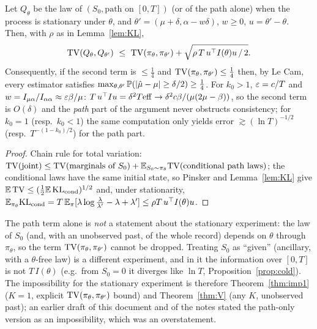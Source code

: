 \begin{theorem}[two-point bound for the stationary experiment, $K=1$]\label{thm:B}\Pt{}
Let $Q_\theta$ be the law of $(S_0,\text{path on }[0,T])$ (or of the path alone) when the process is stationary under $\theta$, and $\theta'=(\mu+\delta,\alpha-w\delta)$, $w\ge0$, $u=\theta'-\theta$. Then, with $\rho$ as in Lemma~\ref{lem:KL},
\[
\TV(Q_\theta,Q_{\theta'})\ \le\ \TV(\pi_\theta,\pi_{\theta'})+\sqrt{\rho\,T\,u\T I(\theta)u\,/\,2}.
\]
Consequently, if the second term is $\le\frac14$ and $\TV(\pi_\theta,\pi_{\theta'})\le\frac14$ then, by Le Cam, every estimator satisfies $\max_{\theta,\theta'}\P(|\hat\mu-\mu|\ge\delta/2)\ge\frac14$.
For $k_0>1$, $\eps=c/T$ and $w=I_{\mu\alpha}/I_{\alpha\alpha}\approx\eps\beta/\mu$: $T\,u\T I u=\delta^2T\eff\to\delta^2c\beta/(\mu(2\mu-\beta))$, so the second term is $O(\delta)$ and the \emph{path} part of the argument never obstructs consistency; for $k_0=1$ (resp.\ $k_0<1$) the same computation only yields error $\gtrsim(\ln T)^{-1/2}$ (resp.\ $T^{-(1-k_0)/2}$) for the path part.
\end{theorem}
\begin{proof}
Chain rule for total variation: $\TV(\text{joint})\le\TV(\text{marginals of }S_0)+\E_{S_0\sim\pi_\theta}\TV(\text{conditional path laws})$; the conditional laws have the same initial state, so Pinsker and Lemma~\ref{lem:KL} give $\E\,\TV\le(\tfrac12\E\,\KL_{\mathrm{cond}})^{1/2}$ and, under stationarity, $\E_{\pi_\theta}\KL_{\mathrm{cond}}=T\,\E_\pi[\lambda\log\frac\lambda{\lambda'}-\lambda+\lambda']\le\rho T\,u\T I(\theta)u$.
\end{proof}
\begin{remark}
The path term alone is \emph{not} a statement about the stationary experiment: the law of $S_0$ (and, with an unobserved past, of the whole record) depends on $\theta$ through $\pi_\theta$, so the term $\TV(\pi_\theta,\pi_{\theta'})$ cannot be dropped. Treating $S_0$ as ``given'' (ancillary, with a $\theta$-free law) is a different experiment, and in it the information over $[0,T]$ is not $T\,I(\theta)$ (e.g.\ from $S_0=0$ it diverges like $\ln T$, Proposition~\ref{prop:cold}). The impossibility for the stationary experiment is therefore Theorem~\ref{thm:imp1} ($K=1$, explicit $\TV(\pi_\theta,\pi_{\theta'})$ bound) and Theorem~\ref{thm:V} (any $K$, unobserved past); an earlier draft of this document and of the notes stated the path-only version as an impossibility, which was an overstatement.
\end{remark}

